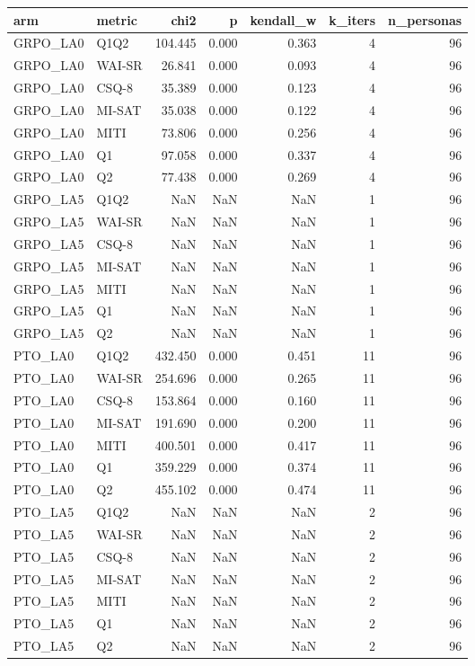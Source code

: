 \begin{tabular}{llrrrrr}
\toprule
arm & metric & chi2 & p & kendall\_w & k\_iters & n\_personas \\
\midrule
GRPO\_LA0 & Q1Q2 & 104.445 & 0.000 & 0.363 & 4 & 96 \\
GRPO\_LA0 & WAI-SR & 26.841 & 0.000 & 0.093 & 4 & 96 \\
GRPO\_LA0 & CSQ-8 & 35.389 & 0.000 & 0.123 & 4 & 96 \\
GRPO\_LA0 & MI-SAT & 35.038 & 0.000 & 0.122 & 4 & 96 \\
GRPO\_LA0 & MITI & 73.806 & 0.000 & 0.256 & 4 & 96 \\
GRPO\_LA0 & Q1 & 97.058 & 0.000 & 0.337 & 4 & 96 \\
GRPO\_LA0 & Q2 & 77.438 & 0.000 & 0.269 & 4 & 96 \\
GRPO\_LA5 & Q1Q2 & NaN & NaN & NaN & 1 & 96 \\
GRPO\_LA5 & WAI-SR & NaN & NaN & NaN & 1 & 96 \\
GRPO\_LA5 & CSQ-8 & NaN & NaN & NaN & 1 & 96 \\
GRPO\_LA5 & MI-SAT & NaN & NaN & NaN & 1 & 96 \\
GRPO\_LA5 & MITI & NaN & NaN & NaN & 1 & 96 \\
GRPO\_LA5 & Q1 & NaN & NaN & NaN & 1 & 96 \\
GRPO\_LA5 & Q2 & NaN & NaN & NaN & 1 & 96 \\
PTO\_LA0 & Q1Q2 & 432.450 & 0.000 & 0.451 & 11 & 96 \\
PTO\_LA0 & WAI-SR & 254.696 & 0.000 & 0.265 & 11 & 96 \\
PTO\_LA0 & CSQ-8 & 153.864 & 0.000 & 0.160 & 11 & 96 \\
PTO\_LA0 & MI-SAT & 191.690 & 0.000 & 0.200 & 11 & 96 \\
PTO\_LA0 & MITI & 400.501 & 0.000 & 0.417 & 11 & 96 \\
PTO\_LA0 & Q1 & 359.229 & 0.000 & 0.374 & 11 & 96 \\
PTO\_LA0 & Q2 & 455.102 & 0.000 & 0.474 & 11 & 96 \\
PTO\_LA5 & Q1Q2 & NaN & NaN & NaN & 2 & 96 \\
PTO\_LA5 & WAI-SR & NaN & NaN & NaN & 2 & 96 \\
PTO\_LA5 & CSQ-8 & NaN & NaN & NaN & 2 & 96 \\
PTO\_LA5 & MI-SAT & NaN & NaN & NaN & 2 & 96 \\
PTO\_LA5 & MITI & NaN & NaN & NaN & 2 & 96 \\
PTO\_LA5 & Q1 & NaN & NaN & NaN & 2 & 96 \\
PTO\_LA5 & Q2 & NaN & NaN & NaN & 2 & 96 \\
\bottomrule
\end{tabular}
